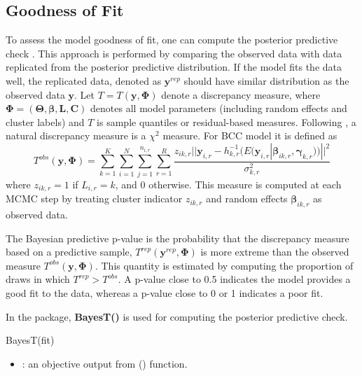 \subsection{Goodness of Fit}
To assess the model goodness of fit, one can compute the posterior predictive check \citep{Gelman1996}. This approach is performed by comparing the observed data with data replicated from the posterior predictive distribution. If the model fits the data well, the replicated data, denoted as $\boldsymbol{y}^{rep}$ should have similar distribution as the observed data $\boldsymbol{y}$.   Let $T = T(\boldsymbol{y},\boldsymbol{\Phi})$ denote a discrepancy measure, where $\boldsymbol{\Phi} = (\boldsymbol{\Theta}, \boldsymbol{\beta}, \boldsymbol{L}, \boldsymbol{C})$ denotes all model parameters (including random effects and cluster labels) and $T$ is sample quantiles or residual-based measures. Following \citet{Gelman1996}, a natural discrepancy measure is a $\chi^2$ measure. For BCC model it is defined as 
\begin{equation}
T^{obs}(\boldsymbol{y},\boldsymbol{\Phi})= \sum^K_{k=1} \sum_{i=1}^N \sum_{j=1}^{n_{i,r}}   \sum_{r=1}^R \frac{ z_{ik,r} ||\boldsymbol{y}_{i,r} - h^{-1}_{k,r}(E(\boldsymbol{y}_{i,r}|\boldsymbol{\beta}_{ik,r},\boldsymbol{\gamma}_{k,r}))||^2}{\sigma_{k,r}^2} 
\end{equation}
where $z_{ik,r} = 1$ if $L_{i,r}=k$, and 0 otherwise. This measure is computed at each MCMC step by treating cluster indicator $z_{ik,r}$ and random effects $\boldsymbol{\beta}_{ik,r}$ as observed data.

The Bayesian predictive p-value is the probability that the discrepancy measure based on a predictive sample, $ T^{rep}(\boldsymbol{y}^{rep},\boldsymbol{\Phi})$ is more extreme than the observed measure $T^{obs}(\boldsymbol{y},\boldsymbol{\Phi})$. This quantity is estimated by computing the proportion of draws in which $T^{rep} > T^{obs}$. A p-value close to 0.5 indicates the model provides a good fit to the data, whereas a p-value close to 0 or 1 indicates a poor fit.

In the  package, \textbf{BayesT()} is used for computing the posterior predictive check. 
\begin{example}
BayesT(fit)
\end{example}

\begin{itemize}
	\item {}: an objective output from () function.  
\end{itemize}

